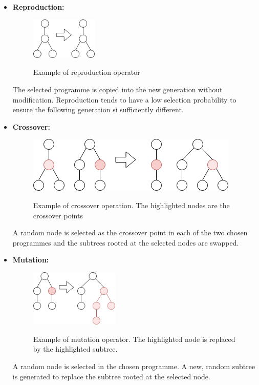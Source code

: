 \documentclass{article}
\begin{document}
			\begin{itemize}
				\item \textbf{Reproduction:} 
				
				\begin{figure}[h]
					\centering
					\includegraphics[width=0.3\textwidth]{5_reproduction}
					\label{fig:reproduction}
					\caption{Example of reproduction operator}
				\end{figure}
				
				The selected programme is copied into the new generation without modification. Reproduction tends to have a low selection probability to ensure the following generation si sufficiently different.
				
				\item \textbf{Crossover:} 
				
				\begin{figure}[h]
					\centering
					\includegraphics[height=0.2\textwidth]{6_crossover}
					\label{fig:crossover}
					\caption{Example of crossover operation. The highlighted nodes are the crossover points}
				\end{figure}
				
				A random node is selected as the crossover point in each of the two chosen programmes and the subtrees rooted at the selected nodes are swapped.

				
				\item \textbf{Mutation:} 
				
				\begin{figure}[h]
					\centering
					\includegraphics[width=0.4\textwidth]{7_mutation}
					\label{fig:mutation}
					\caption{Example of mutation operator. The highlighted node is replaced by the highlighted subtree.}
				\end{figure}
				
				A random node is selected in the chosen programme. A new, random subtree is generated to replace the subtree rooted at the selected node.
			\end{itemize}
			
\end{document}
